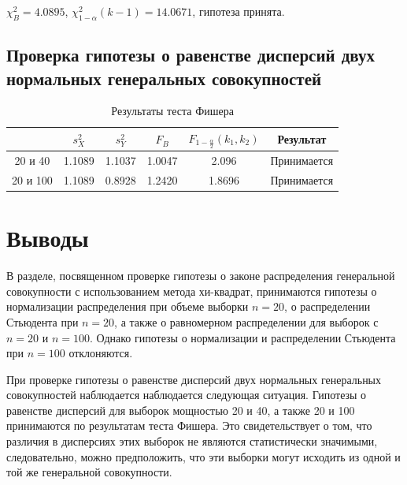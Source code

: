 \documentclass[12pt,a4paper]{article}
\begin{document}
	\( \chi_B^2 = 4.0895 \), \( \chi_{1 - \alpha}^2 (k - 1) = 14.0671 \),
	гипотеза принята.

	\subsection{Проверка гипотезы о равенстве дисперсий двух нормальных
		генеральных совокупностей}

	\begin{table}[htbp]
		\centering
		\begin{tabular}{ |c|c|c|c|c|c| }
			\hline
			& \( s_X^2 \) & \( s_Y^2 \) & \( F_B \)
			& \(F_{1 - \frac{\alpha}{2}} (k_1, k_2) \) & Результат \\
			\hline
			20 и 40 & 1.1089 & 1.1037 & 1.0047 & 2.096 & Принимается \\ \hline
			20 и 100 & 1.1089 & 0.8928 & 1.2420 & 1.8696 & Принимается \\ \hline
		\end{tabular}
		\caption{Результаты теста Фишера}
	\end{table}

	\section{Выводы}

	В разделе, посвященном проверке гипотезы о законе распределения
	генеральной совокупности с использованием метода хи-квадрат,
	принимаются гипотезы о нормализации распределения при объеме
	выборки \( n=20 \), о распределении Стьюдента при \( n=20 \), а также о
	равномерном распределении для выборок с \( n=20 \) и \( n=100 \). Однако
	гипотезы о нормализации и распределении Стьюдента при \( n=100 \)
	отклоняются.

	При проверке гипотезы о равенстве дисперсий двух нормальных
	генеральных совокупностей наблюдается наблюдается следующая ситуация.
	Гипотезы о равенстве дисперсий для выборок мощностью 20 и 40, а также
	20 и 100 принимаются по результатам теста Фишера. Это свидетельствует
	о том, что различия в дисперсиях этих выборок не являются
	статистически значимыми, следовательно, можно предположить, что эти
	выборки могут исходить из одной и той же генеральной совокупности.
\end{document}
